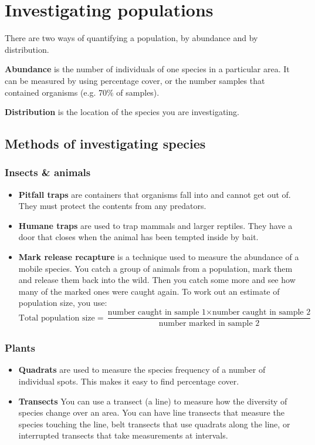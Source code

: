 \documentclass{article}
\begin{document}
\section*{Investigating populations}
There are two ways of quantifying a population, by abundance and by
distribution.

\textbf{Abundance} is the number of individuals of one species in a particular
area. It can be measured by using percentage cover, or the number samples that
contained organisms (e.g. 70\% of samples).

\textbf{Distribution} is the location of the species you are investigating.

\subsection*{Methods of investigating species}
\subsubsection*{Insects \& animals}
\begin{itemize}
	\item \textbf{Pitfall traps} are containers that organisms fall into and
	cannot get out of. They must protect the contents from any predators.
	\item \textbf{Humane traps} are used to trap mammals and larger reptiles.
	They have a door that closes when the animal has been tempted inside by
	bait.
	\item \textbf{Mark release recapture} is a technique used to measure the
	abundance of a mobile species. You catch a group of animals from a
	population, mark them and release them back into the wild. Then you catch
	some more and see how many of the marked ones were caught again. To work out
	an estimate of population size, you use:
	\[
		\textrm{Total population size} = \frac{\textrm{number caught in sample
		1} \times \textrm{number caught in sample 2}}{\textrm{number marked in
		sample 2}}
	\]
\end{itemize}
\subsubsection*{Plants}
\begin{itemize}
	\item \textbf{Quadrats} are used to measure the species frequency of a
	number of individual spots. This makes it easy to find percentage cover.
	\item \textbf{Transects} You can use a transect (a line) to measure how the
	diversity of species change over an area. You can have line transects that
	measure the species touching the line, belt transects that use quadrats
	along the line, or interrupted transects that take measurements at
	intervals.
\end{itemize}
\end{document}
